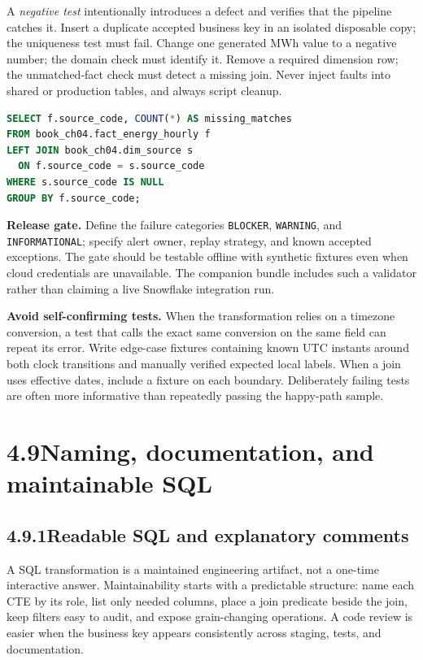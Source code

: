 \documentclass[11pt,twoside]{article}
\newcommand{\topic}[2]{\subsection*{#1\quad #2}}
\begin{document}
A \emph{negative test} intentionally introduces a defect and verifies that the pipeline catches it. Insert a duplicate accepted business key in an isolated disposable copy; the uniqueness test must fail. Change one generated MWh value to a negative number; the domain check must identify it. Remove a required dimension row; the unmatched-fact check must detect a missing join. Never inject faults into shared or production tables, and always script cleanup.

\begin{lstlisting}[language=SQL,caption={Left anti-join: facts without matching source dimension.}]
SELECT f.source_code, COUNT(*) AS missing_matches
FROM book_ch04.fact_energy_hourly f
LEFT JOIN book_ch04.dim_source s
  ON f.source_code = s.source_code
WHERE s.source_code IS NULL
GROUP BY f.source_code;
\end{lstlisting}

\textbf{Release gate.} Define the failure categories \texttt{BLOCKER}, \texttt{WARNING}, and \texttt{INFORMATIONAL}; specify alert owner, replay strategy, and known accepted exceptions. The gate should be testable offline with synthetic fixtures even when cloud credentials are unavailable. The companion bundle includes such a validator rather than claiming a live Snowflake integration run.


\textbf{Avoid self-confirming tests.} When the transformation relies on a timezone conversion, a test that calls the exact same conversion on the same field can repeat its error. Write edge-case fixtures containing known UTC instants around both clock transitions and manually verified expected local labels. When a join uses effective dates, include a fixture on each boundary. Deliberately failing tests are often more informative than repeatedly passing the happy-path sample.

\newpage
\section*{4.9\quad Naming, documentation, and maintainable SQL}
\topic{4.9.1}{Readable SQL and explanatory comments}
A SQL transformation is a maintained engineering artifact, not a one-time interactive answer. Maintainability starts with a predictable structure: name each CTE by its role, list only needed columns, place a join predicate beside the join, keep filters easy to audit, and expose grain-changing operations. A code review is easier when the business key appears consistently across staging, tests, and documentation.
\end{document}
